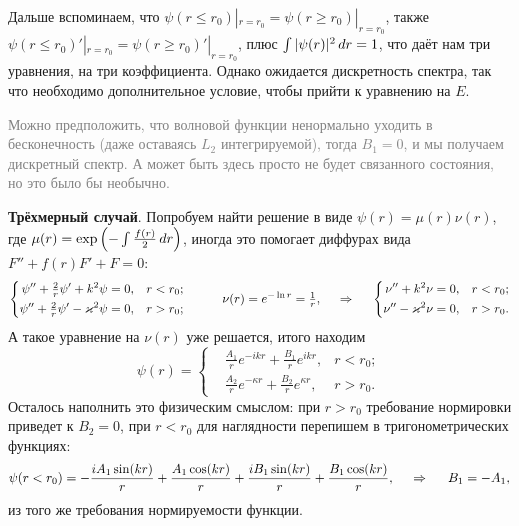 Дальше вспоминаем, что $\psi(r \leq r_0) |_{r=r_0} = \psi(r \geq r_0) |_{r=r_0}$, также $\psi(r \leq r_0)' |_{r=r_0} = \psi(r \geq r_0)' |_{r=r_0}$, плюс $\int |\psi(r)|^2 \, d r = 1$, что даёт нам три уравнения, на три коэффициента. Однако ожидается дискретность спектра, так что необходимо дополнительное условие, чтобы прийти к уравнению на $E$. 

\textcolor{gray}{
Можно предположить, что волновой функции ненормально уходить в бесконечность (даже оставаясь $L_2$ интегрируемой), тогда $B_1 = 0$, и мы получаем дискретный спектр. А может быть здесь просто не будет связанного состояния, но это было бы необычно. 
}


















\textbf{Трёхмерный случай}. Попробуем найти решение в виде $\psi(r) = \mu(r) \nu(r)$, где $\mu(r) = \exp\left(
    - \int \frac{f(r)}{2} \, d r
\right)$, иногда это помогает диффурах вида $F'' + f(r) F' + F = 0$:
\begin{equation*}
    \left\{\begin{aligned}
        \psi'' + \tfrac{2}{r} \psi' + k^2 \psi &= 0,  &r < r_0; \\
        \psi'' + \tfrac{2}{r} \psi' - \kappa^2 \psi &= 0, &r > r_0;
    \end{aligned}\right.
    \hspace{10 mm} 
    \nu(r) = e^{- \ln r} = \tfrac{1}{r},
    \hspace{0.5cm} \Rightarrow \hspace{0.5cm}
    \left\{\begin{aligned}
         \nu'' + k^2 \nu &= 0,  &r < r_0; \\
         \nu'' - \kappa^2 \nu &= 0, &r > r_0.
    \end{aligned}\right.
\end{equation*}
А такое уравнение на $\nu(r)$ уже решается, итого находим
\begin{equation*}
    \psi(r) = \left\{\begin{aligned}
        &\tfrac{A_1}{r} e^{- i k r} + \tfrac{B_1}{r} e^{i k r}, &r<r_0; \\
        &\tfrac{A_2}{r} e^{- \kappa r} + \tfrac{B_2}{r} e^{\kappa r}, &r>r_0.
    \end{aligned}\right.
\end{equation*}
Осталось наполнить это физическим смыслом: при $r > r_0$ требование нормировки приведет к $B_2 = 0$, при $r < r_0$ для наглядности перепишем в тригонометрических функциях:
\begin{equation*}
    \psi(r < r_0) = -\frac{i A_1 \sin (k r)}{r}+\frac{A_1 \cos (k r)}{r}+\frac{i B_1 \sin (k r)}{r}+\frac{B_1 \cos (k r)}{r},
    \hspace{0.5cm} \Rightarrow \hspace{0.5cm}
    B_1 = -A_1,
\end{equation*}
из того же требования нормируемости функции. 

